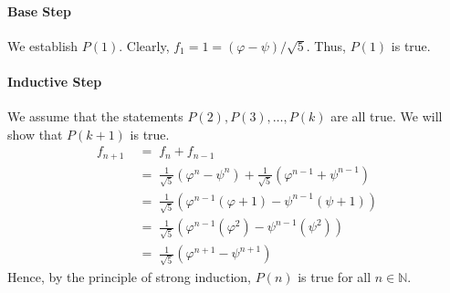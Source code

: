 \documentclass[10pt]{article}
\begin{document}
\begin{enumerate}
\begin{enumerate}
                        \paragraph{Base Step}
                        We establish $P(1)$. Clearly, $f_1 = 1 = (\varphi - \psi)/\sqrt{5}$. Thus, $P(1)$ is true.
                        \paragraph{Inductive Step}
                        We assume that the statements $P(2), P(3), \dots, P(k)$ are all true. We will show that $P(k + 1)$ is true.
                        \begin{align*}
                                f_{n + 1} \;&=\; f_{n} + f_{n - 1} \\
                                        \;&=\; \frac{1}{\sqrt{5}}(\varphi^n - \psi^n) + \frac{1}{\sqrt{5}}(\varphi^{n - 1} + \psi^{n - 1}) \\
                                        \;&=\; \frac{1}{\sqrt{5}}(\varphi^{n - 1}(\varphi + 1) - \psi^{n - 1}(\psi + 1)) \\
                                        \;&=\; \frac{1}{\sqrt{5}}(\varphi^{n - 1}(\varphi^2) - \psi^{n - 1}(\psi^2)) \\
                                        \;&=\; \frac{1}{\sqrt{5}}(\varphi^{n + 1} - \psi^{n + 1})
                        \end{align*}
                        Hence, by the principle of strong induction, $P(n)$ is true for all $n \in \mathbb{N}$.
                        
                \end{enumerate}
        \end{enumerate}
\end{document}
